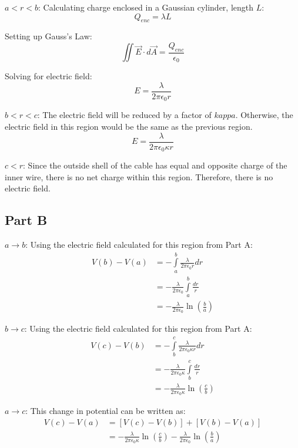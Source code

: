 \documentclass{article}
\begin{document}
\bigbreak

$a < r < b$: Calculating charge enclosed in a Gaussian cylinder, length $L$:
$$ Q_{enc} = \lambda L $$

Setting up Gauss's Law:
$$ \iint \vec{E} \cdot d\vec{A} = \frac{ Q_{enc} }{ \epsilon_{0} } $$

Solving for electric field:
$$ E = \frac{ \lambda }{ 2 \pi \epsilon_{0} r } $$

\bigbreak

$b < r < c$: The electric field will be reduced by a factor of $kappa$.
Otherwise, the electric field in this region would be the same as the previous
region.
$$ E = \frac{ \lambda }{ 2 \pi \epsilon_{0} \kappa r } $$

\bigbreak

$c < r$: Since the outside shell of the cable has equal and opposite charge of
the inner wire, there is no net charge within this region. Therefore, there is
no electric field.

\subsection*{Part B}

$a \longrightarrow b$: Using the electric field calculated for this region from
Part A:
\begin{align*}
  V(b) - V(a) &= -\int\limits_{a}^{b} \frac{ \lambda }{ 2 \pi \epsilon_{0} r }
  dr \\
              &= -\frac{ \lambda }{ 2 \pi \epsilon_{0} } \int\limits_{a}^{b}
  \frac{ dr }{ r } \\
              &= -\frac{ \lambda }{ 2 \pi \epsilon_{0} } \ln \left( \frac{
              b }{ a } \right)
\end{align*}

\bigbreak

$b \longrightarrow c$: Using the electric field calculated for this region from
Part A:
\begin{align*}
  V(c) - V(b) &= -\int\limits_{b}^{c} \frac{ \lambda }{ 2 \pi \epsilon_{0}
  \kappa r } dr \\
              &= -\frac{ \lambda }{ 2 \pi \epsilon_{0} \kappa }
  \int\limits_{b}^{c} \frac{ dr }{ r } \\
              &= -\frac{ \lambda }{ 2 \pi \epsilon_{0} \kappa } \ln \left(
  \frac{ c }{ b } \right)
\end{align*}

\bigbreak

$a \longrightarrow c$: This change in potential can be written as:
\begin{align*}
  V(c) - V(a) &= \left[V(c) - V(b)\right] + \left[V(b) - V(a)\right] \\
              &= -\frac{ \lambda }{ 2 \pi \epsilon_{0} \kappa } \ln \left(
  \frac{ c }{ b } \right) -\frac{ \lambda }{ 2 \pi \epsilon_{0} } \ln \left( \frac{
              b }{ a } \right)
\end{align*}
\end{document}
